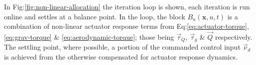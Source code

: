 In Fig:\ref{fig:non-linear-allocation} the iteration loop is shown, each iteration is run online and settles at a balance point. In the loop, the block $B_u(\mathbf{x},u,t)$ is a combination of non-linear actuator response terms from Eq:\ref{eq:actuator-torque},\ref{eq:grav-torque} \& \ref{eq:aerodynamic-torque}; those being $\vec{\tau}_Q$, $\vec{\tau}_g$ \& $\vec{Q}$ respectively. The settling point, where possible, a portion of the commanded control input $\vec{\nu}_d$ is achieved from the otherwise compensated for actuator response dynamics.